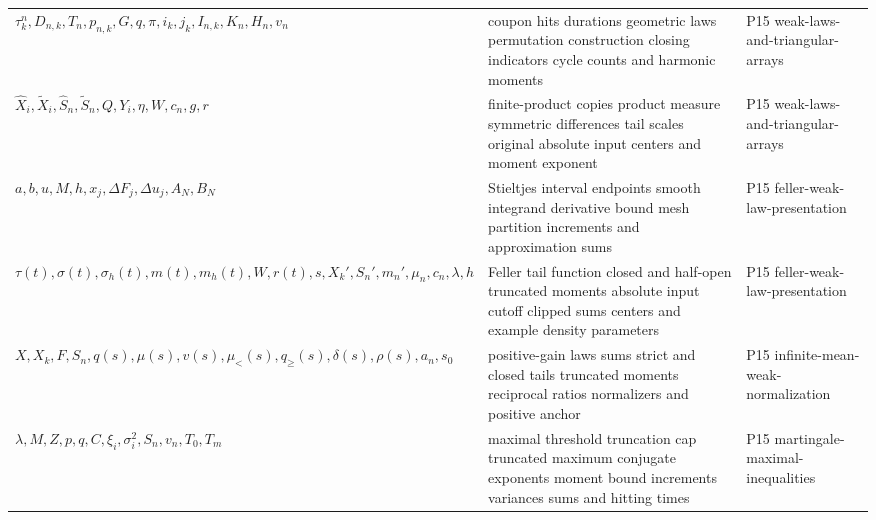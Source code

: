 \begin{longtable}{@{}p{}p{}p{}@{}}
\(\tau_k^n,\allowbreak D_{n,k},\allowbreak T_n,\allowbreak p_{n,k},\allowbreak G,\allowbreak q,\allowbreak \pi,\allowbreak i_k,\allowbreak j_k,\allowbreak I_{n,k},\allowbreak K_n,\allowbreak H_n,\allowbreak v_n\) & coupon hits durations geometric laws permutation construction closing indicators cycle counts and harmonic moments & P15 weak-\allowbreak{}laws-\allowbreak{}and-\allowbreak{}triangular-\allowbreak{}arrays \\
\(\widehat X_i,\allowbreak \widetilde X_i,\allowbreak \widehat S_n,\allowbreak \widetilde S_n,\allowbreak Q,\allowbreak Y_i,\allowbreak \eta,\allowbreak W,\allowbreak c_n,\allowbreak g,\allowbreak r\) & finite-product copies product measure symmetric differences tail scales original absolute input centers and moment exponent & P15 weak-\allowbreak{}laws-\allowbreak{}and-\allowbreak{}triangular-\allowbreak{}arrays \\
\(a,\allowbreak b,\allowbreak u,\allowbreak M,\allowbreak h,\allowbreak x_j,\allowbreak \Delta F_j,\allowbreak \Delta u_j,\allowbreak A_N,\allowbreak B_N\) & Stieltjes interval endpoints smooth integrand derivative bound mesh partition increments and approximation sums & P15 feller-\allowbreak{}weak-\allowbreak{}law-\allowbreak{}presentation \\
\(\tau(t),\allowbreak \sigma(t),\allowbreak \sigma_h(t),\allowbreak m(t),\allowbreak m_h(t),\allowbreak W,\allowbreak r(t),\allowbreak s,\allowbreak X_k',\allowbreak S_n',\allowbreak m_n',\allowbreak \mu_n,\allowbreak c_n,\allowbreak \lambda,\allowbreak h\) & Feller tail function closed and half-open truncated moments absolute input cutoff clipped sums centers and example density parameters & P15 feller-\allowbreak{}weak-\allowbreak{}law-\allowbreak{}presentation \\
\(X,\allowbreak X_k,\allowbreak F,\allowbreak S_n,\allowbreak q(s),\allowbreak \mu(s),\allowbreak v(s),\allowbreak \mu_<(s),\allowbreak q_{\geq}(s),\allowbreak \delta(s),\allowbreak \rho(s),\allowbreak a_n,\allowbreak s_0\) & positive-gain laws sums strict and closed tails truncated moments reciprocal ratios normalizers and positive anchor & P15 infinite-\allowbreak{}mean-\allowbreak{}weak-\allowbreak{}normalization \\
\(\lambda,\allowbreak M,\allowbreak Z,\allowbreak p,\allowbreak q,\allowbreak C,\allowbreak \xi_i,\allowbreak \sigma_i^2,\allowbreak S_n,\allowbreak v_n,\allowbreak T_0,\allowbreak T_m\) & maximal threshold truncation cap truncated maximum conjugate exponents moment bound increments variances sums and hitting times & P15 martingale-\allowbreak{}maximal-\allowbreak{}inequalities \\

\end{longtable}
